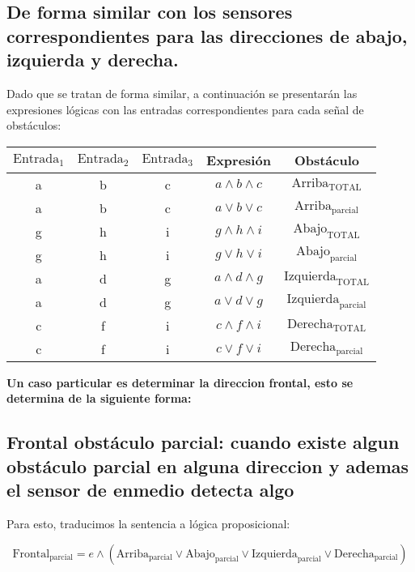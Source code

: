 \subsection{De forma similar con los sensores correspondientes para las direcciones de abajo, izquierda y derecha.}
Dado que se tratan de forma similar, a continuación se presentarán las expresiones lógicas con las entradas correspondientes para cada señal de obstáculos:
\begin{table}[!ht]
    \centering
    \begin{tabular}{|c|c|c|c|c|}
        \hline
        $\text{Entrada}_1$ & $\text{Entrada}_2$ & $\text{Entrada}_3$ & Expresión & Obstáculo \\
        \hline
        a & b & c & $a \wedge b \wedge c$ & $\text{Arriba}_{\text{TOTAL}}$ \\
        \hline
        a & b & c & $a \vee b \vee c$ & $\text{Arriba}_{\text{parcial}}$ \\
        \hline
        g & h & i & $g \wedge h \wedge i$ & $\text{Abajo}_{\text{TOTAL}}$ \\
        \hline
        g & h & i & $g \vee h \vee i$ & $\text{Abajo}_{\text{parcial}}$ \\
        \hline
        a & d & g & $a \wedge d \wedge g$ & $\text{Izquierda}_{\text{TOTAL}}$ \\
        \hline
        a & d & g & $a \vee d \vee g$ & $\text{Izquierda}_{\text{parcial}}$ \\
        \hline
        c & f & i & $c \wedge f \wedge i$ & $\text{Derecha}_{\text{TOTAL}}$ \\
        \hline
        c & f & i & $c \vee f \vee i$ & $\text{Derecha}_{\text{parcial}}$ \\
        \hline
    \end{tabular}
\end{table}

\textbf{\Large Un caso particular es determinar la direccion frontal, esto se determina de la siguiente forma:}
\subsection{Frontal obstáculo parcial: cuando existe algun obstáculo parcial en alguna direccion y ademas el sensor de enmedio detecta algo}

Para esto, traducimos la sentencia a lógica proposicional:

\begin{equation*}
    \text{Frontal}_{\text{parcial}} = e \wedge (\text{Arriba}_{\text{parcial}} \vee \text{Abajo}_{\text{parcial}} \vee \text{Izquierda}_{\text{parcial}} \vee \text{Derecha}_{\text{parcial}})
\end{equation*}

